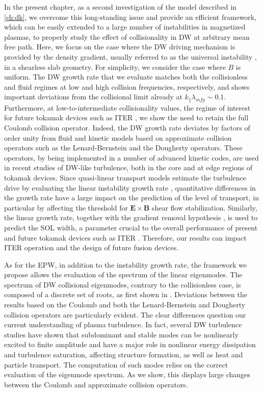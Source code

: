 %
In the present chapter, as a second investigation of the model described in \cref{ch:dk}, we overcome this long-standing issue and provide an efficient framework, which can be easily extended to a large number of instabilities in magnetized plasmas, to properly study the effect of collisionality in DW at arbitrary mean free path.
%
Here, we focus on the case where the DW driving mechanism is provided by the density gradient, usually referred to as the universal instability \citep{Landreman2015}, in a shearless slab geometry.
%
For simplicity, we consider the case where $B$ is uniform.
%
The DW growth rate that we evaluate matches both the collisionless and fluid regimes at low and high collision frequencies, respectively, and shows important deviations from the collisional limit already at $k_\parallel \lambda_{mfp} \sim 0.1$.
%
Furthermore, at low-to-intermediate collisionality values, the regime of interest for future tokamak devices such as ITER \citep{Aymar2002}, we show the need to retain the full Coulomb collision operator.
%
Indeed, the DW growth rate deviates by factors of order unity from fluid and kinetic models based on approximate collision operators such as the Lenard-Bernstein \citep{Lenard1958} and the Dougherty \citep{Dougherty1964} operators.
%
These operators, by being implemented in a number of advanced kinetic codes, are used in recent studies of DW-like turbulence, both in the core \citep{Hatch2013,Nakata2016,Grandgirard2016,Mandell2018} and at edge \citep{Shi2017,Pan2018} regions of tokamak devices.
%
Since quasi-linear transport models estimate the turbulence drive by evaluating the linear instability growth rate \citep{Chen2000,Bourdelle2015}, quantitative differences in the growth rate  have a large impact on the prediction of the level of transport, in particular by affecting the threshold for $\mathbf E \times \mathbf B$ shear flow stabilization.
%
Similarly, the linear growth rate, together with the gradient removal hypothesis \citep{Ricci2013}, is used to predict the SOL width, a parameter crucial to the overall performance of present and future tokamak devices such as ITER \citep{Halpern2013}.
%
Therefore, our results can impact ITER operation and the design of future fusion devices.

%
As for the EPW, in addition to the instability growth rate, the framework we propose allows the evaluation of the spectrum of the linear eigenmodes.
%
The spectrum of DW collisional eigenmodes, contrary to the collisionless case, is composed of a discrete set of roots, as first shown in \citep{Ng1999}.
%
Deviations between the results based on the Coulomb and both the Lenard-Bernstein and Dougherty collision operators are particularly evident.
%
The clear differences question our current understanding of plasma turbulence.
%
In fact, several DW turbulence studies have shown that subdominant and stable modes can be nonlinearly excited to finite amplitude \citep{Terry2006,Hatch2011,Hatch2011a,Pueschel2016} and have a major role in nonlinear energy dissipation and turbulence saturation, affecting structure formation, as well as heat and particle transport.
%
The computation of such modes relies on the correct evaluation of the eigenmode spectrum. 
%
{As we show, this displays large changes between the Coulomb and approximate collision operators}.


